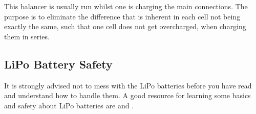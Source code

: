 This balancer is usually run whilst one is charging the main
connections. The purpose is to eliminate the difference that is
inherent in each cell not being exactly the same, such that one cell
does not get overcharged, when charging them in series.

\subsection{LiPo Battery Safety}
\begin{tcolorbox}[colback=yellow!75!,colframe=red]
It is strongly advised not to mess with the LiPo batteries before you
have read and understand how to handle them. A good resource for
learning some basics and safety about LiPo batteries are
\citep{tjintech:lipo-basics} and \citep{tjintech:lipo-safety}.
\end{tcolorbox}
 
